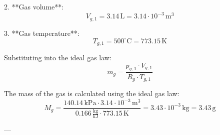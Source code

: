 2. **Gas volume**:  
\[
V_{g,1} = 3.14 \, \text{L} = 3.14 \cdot 10^{-3} \, \text{m}^3
\]

3. **Gas temperature**:  
\[
T_{g,1} = 500^\circ\text{C} = 773.15 \, \text{K}
\]

Substituting into the ideal gas law:  
\[
m_g = \frac{p_{g,1} \cdot V_{g,1}}{R_g \cdot T_{g,1}}
\]

The mass of the gas is calculated using the ideal gas law:  
\[
M_g = \frac{140.14 \, \text{kPa} \cdot 3.14 \cdot 10^{-3} \, \text{m}^3}{0.166 \, \frac{\text{kg}}{\text{kJ}} \cdot 773.15 \, \text{K}} = 3.43 \cdot 10^{-3} \, \text{kg} = 3.43 \, \text{g}
\]

---
